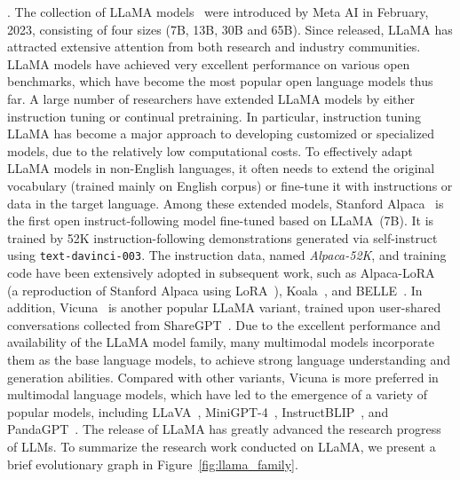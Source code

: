 {{. The collection of LLaMA models~\cite{Touvron-arxiv-2023-LLaMA}  
were introduced by Meta AI in February, 2023, consisting of four sizes (7B, 13B, 30B and 65B).  
Since released, LLaMA has attracted extensive attention from both research and industry communities. 
LLaMA models have achieved very excellent performance on various open benchmarks, which have become the most popular open language models thus far. 
A large number of researchers have extended LLaMA models by either instruction tuning or continual pretraining. In particular, instruction tuning LLaMA has become a major approach to developing customized or specialized models, due to the relatively low computational costs.  
To effectively adapt LLaMA models in non-English languages, it often needs to extend the original vocabulary (trained mainly  on English corpus) or fine-tune it with instructions or data in the target language. 
Among these extended models,  Stanford Alpaca~\cite{Taori-github-2023-Stanford} is the first open instruct-following model fine-tuned based on LLaMA~(7B). It is trained by 52K instruction-following demonstrations generated via self-instruct~\cite{Wang-arXiv-2022-Self} using \texttt{text-davinci-003}. 
The instruction data, named \emph{Alpaca-52K}, and training code have been extensively adopted  in subsequent work, such as Alpaca-LoRA~\cite{Alpaca-LoRA} (a reproduction of Stanford Alpaca using LoRA~\cite{Hu-ICLR-2022-LoRA}), Koala~\cite{koala_blogpost_2023}, and BELLE~\cite{BELLE}. In addition, Vicuna~\cite{vicuna2023} is another popular LLaMA variant,   trained upon user-shared conversations collected from ShareGPT~\cite{ShareGPT}. 
Due to the excellent  performance and availability of the LLaMA model family, many multimodal models incorporate them as the base language models, to achieve strong language understanding and generation abilities. 
Compared with other variants, Vicuna is more preferred in multimodal language models, which have led to the emergence of a variety of popular models, including  LLaVA~\cite{Liu-arxiv-2023-Visual}, MiniGPT-4~\cite{Zhu-arxiv-2023-MiniGPT-4}, InstructBLIP~\cite{Dai-2023-arxiv-InstructBLIP}, and PandaGPT~\cite{su-2023-arxiv-pandagpt}. %
The release of LLaMA has greatly advanced the research progress of LLMs. %
{To  summarize the research work conducted on  LLaMA, we present a brief evolutionary graph in Figure~\ref{fig:llama_family}. 
}


%


}}
